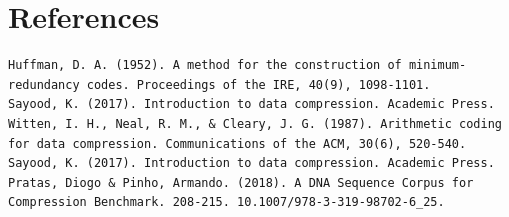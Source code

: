 \documentclass[12pt,twoside]{reedthesis}
\begin{document}
\backmatter

\hypertarget{references}{%
\chapter*{References}\label{references}}


\noindent

\setlength{\parindent}{-0.20in}
\begin{verbatim}
Huffman, D. A. (1952). A method for the construction of minimum-redundancy codes. Proceedings of the IRE, 40(9), 1098-1101.
Sayood, K. (2017). Introduction to data compression. Academic Press.
Witten, I. H., Neal, R. M., & Cleary, J. G. (1987). Arithmetic coding for data compression. Communications of the ACM, 30(6), 520-540.
Sayood, K. (2017). Introduction to data compression. Academic Press.
Pratas, Diogo & Pinho, Armando. (2018). A DNA Sequence Corpus for Compression Benchmark. 208-215. 10.1007/978-3-319-98702-6_25.
\end{verbatim}
\hypertarget{refs}{}
\end{document}
